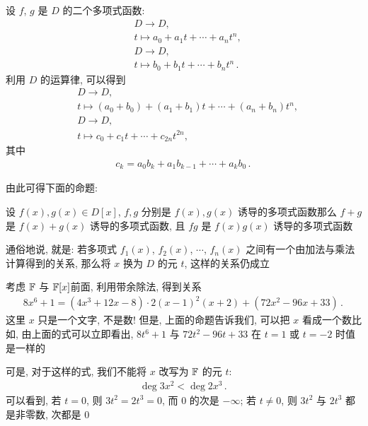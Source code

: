 \begin{example}
    设 $f$, $g$ 是 $D$ 的二个多项式函数:
    \begin{align*}
         & D \to D, \tag*{$f \colon$}                       \\
         & t \mapsto a_0 + a_1 t + \cdots + a_n t^n,        \\
         & D \to D, \tag*{$g \colon$}                       \\
         & t \mapsto b_0 + b_1 t + \cdots + b_n t^n \period
    \end{align*}
    利用 $D$ 的运算律, 可以得到
    \begin{align*}
         & D \to D, \tag*{$f+g \colon$}                                      \\
         & t \mapsto (a_0 + b_0) + (a_1 + b_1) t + \cdots + (a_n + b_n) t^n, \\
         & D \to D, \tag*{$fg \colon$}                                       \\
         & t \mapsto c_0 + c_1 t + \cdots + c_{2n} t^{2n},
    \end{align*}
    其中
    \begin{align*}
        c_k = a_0 b_k + a_1 b_{k-1} + \cdots + a_k b_0 \period
    \end{align*}
\end{example}

由此可得下面的命题:

\begin{proposition}
    设 $f(x),g(x) \in D[x]$, $f,g$ 分别是 $f(x),g(x)$ 诱导的多项式函数\period 那么 $f+g$ 是 $f(x)+g(x)$ 诱导的多项式函数, 且 $fg$ 是 $f(x)g(x)$ 诱导的多项式函数\period

    通俗地说, 就是: 若多项式 $f_1 (x)$, $f_2 (x)$, $\cdots$, $f_n (x)$ 之间有一个由加法与乘法计算得到的关系, 那么将 $x$ 换为 $D$ 的元 $t$, 这样的关系仍成立\period
\end{proposition}

\begin{example}
    考虑 $\mathbb{F}$ 与 $\mathbb{F}[x]$\period 前面, 利用带余除法, 得到关系
    \begin{align*}
        8x^6 + 1 = (4x^3 + 12x - 8) \cdot 2(x-1)^2 (x+2) + (72x^2 - 96x + 33) \period
    \end{align*}
    这里 $x$ 只是一个文字, 不是数! 但是, 上面的命题告诉我们, 可以把 $x$ 看成一个数\period 比如, 由上面的式可以立即看出, $8t^6 + 1$ 与 $72t^2 - 96t + 33$ 在 $t = 1$ 或 $t = -2$ 时值是一样的\period

    可是, 对于这样的式, 我们不能将 $x$ 改写为 $\mathbb{F}$ 的元 $t$:
    \begin{align*}
        \deg 3x^2 < \deg 2x^3 \period
    \end{align*}
    可以看到, 若 $t=0$, 则 $3t^2 = 2t^3 = 0$, 而 $0$ 的次是 $-\infty$; 若 $t \neq 0$, 则 $3t^2$ 与 $2t^3$ 都是非零数, 次都是 $0$\period
\end{example}

